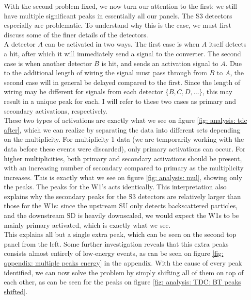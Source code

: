 With the second problem fixed, we now turn our attention to the first: we still have multiple significant peaks in essentially all our panels. The S3 detectors especially are problematic. To understand why this is the case, we must first discuss some of the finer details of the detectors. \\

A detector $A$ can be activated in two ways. The first case is when $A$ itself detects a hit, after which it will immediately send a signal to the \TDC{} converter. The second case is when another detector $B$ is hit, and sends an activation signal to $A$. Due to the additional length of wiring the signal must pass through from $B$ to $A$, the second case will in general be delayed compared to the first. Since the length of wiring may be different for signals from each detector $\{B, C, D,...\}$, this may result in a unique peak for each. I will refer to these two cases as primary and secondary activations, respectively. \\

These two types of activations are exactly what we see on figure \ref{fig: analysis: tdc after}, which we can realize by separating the data into different sets depending on the multiplicity. For multiplicity $1$ data (we are temporarily working with the data before these events were discarded), only primary activations can occur. For higher multiplicities, both primary and secondary activations should be present, with an increasing number of secondary compared to primary as the multiplicity increases. This is exactly what we see on figure \ref{fig: analysis: mul}, showing only the \BT{} peaks. The \FT{} peaks for the W1's acts identically. This interpretation also explains why the secondary peaks for the S3 detectors are relatively larger than those for the W1s: since the upstream SU only detects backscattered particles, and the downstream SD is heavily downscaled, we would expect the W1s to be mainly primary activated, which is exactly what we see. \\

This explains all but a single extra peak, which can be seen on the second top panel from the left. Some further investigation reveals that this extra peaks consists almost entirely of low-energy events, as can be seen on figure \ref{fig: appendix: multiple peaks energy} in the appendix. With the cause of every peak identified, we can now solve the problem by simply shifting all of them on top of each other, as can be seen for the \BT{} peaks on figure \ref{fig: analysis: TDC: BT peaks shifted}. 

